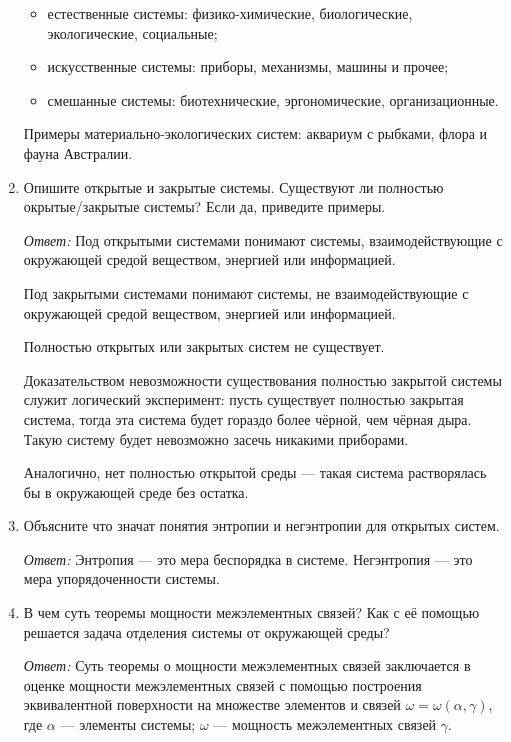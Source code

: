 \documentclass[10pt]{article}
\begin{document}
\begin{enumerate}
  \begin{itemize}
  \item{естественные системы: физико-химические, биологические, экологические, социальные;}
  \item{искусственные системы: приборы, механизмы, машины и прочее;}
  \item{смешанные системы: биотехнические, эргономические, организационные.}
  \end{itemize}

  Примеры материально-экологических систем: аквариум с рыбками, флора и фауна Австралии.

\item{Опишите открытые и закрытые системы. Существуют ли полностью окрытые/закрытые системы? Если да, приведите примеры.}

  \emph{Ответ:} Под открытыми системами понимают системы, взаимодействующие с окружающей средой веществом, энергией или информацией.

  Под закрытыми системами понимают системы, не взаимодействующие с окружающей средой веществом, энергией или информацией.

  Полностью открытых или закрытых систем не существует.

  Доказательством невозможности существования полностью закрытой системы служит логический эксперимент: пусть существует полностью закрытая система, тогда эта система будет гораздо более чёрной, чем чёрная дыра. Такую систему будет невозможно засечь никакими приборами.

  Аналогично, нет полностью открытой среды --- такая система растворялась бы в окружающей среде без остатка.

\item{Объясните что значат понятия энтропии и негэнтропии для открытых систем.}

  \emph{Ответ:} Энтропия --- это мера беспорядка в системе. Негэнтропия --- это мера упорядоченности системы.

\item{В чем суть теоремы мощности межэлементных связей? Как с её помощью решается задача отделения системы от окружающей среды?}

  \emph{Ответ:} Суть теоремы о мощности межэлементных связей заключается в оценке мощности межэлементных связей с помощью построения эквивалентной поверхности на множестве элементов и связей $\omega = \omega (\alpha, \gamma)$, где $\alpha$ --- элементы системы; $\omega$ --- мощность межэлементных связей $\gamma$.


\end{enumerate}
\end{document}

